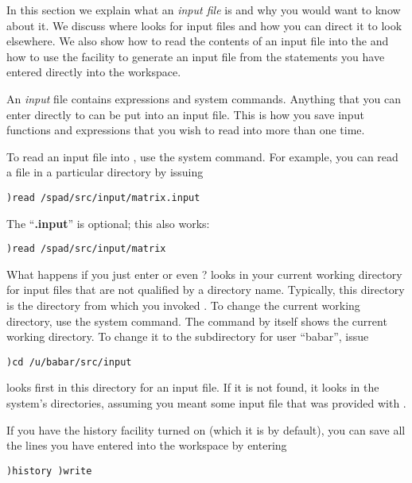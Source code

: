 %
In this section we explain what an {\it input file} is and
why you would want to know about it.
We discuss where \Language{} looks for input files and how you can
direct it to look elsewhere.
We also show how to read the contents of an input file into the
 and how to use the 
facility to generate an input file from the statements you have
entered directly into the workspace.

An {\it input} file contains \Language{} expressions and system
commands.
Anything that you can enter directly to \Language{} can be put
into an input file.
This is how you save input functions and expressions that you wish
to read into \Language{} more than one time.

To read an input file into \Language{}, use the 
system command.
For example, you can read a file in a particular directory by issuing
\begin{verbatim}
)read /spad/src/input/matrix.input
\end{verbatim}
The ``{\bf .input}'' is optional; this also works:
\begin{verbatim}
)read /spad/src/input/matrix
\end{verbatim}
What happens if you just enter
 or even ?
\Language{} looks in your current working directory for input files
that are not qualified by a directory name.
Typically, this directory is the directory from which you invoked
\Language{}.
To change the current working directory, use the  system command.
The command  by itself shows the current
working
directory.
To change it to
the  subdirectory for user ``babar'',
issue
\begin{verbatim}
)cd /u/babar/src/input
\end{verbatim}
\Language{} looks first in this directory for an input file.
If it is not found, it looks in the system's directories, assuming
you meant some input file that was provided with \Language{}.

\beginImportant
If you have the \Language{} history facility turned on (which it is
by default), you can save all the lines you have entered into the
workspace by entering
\begin{verbatim}
)history )write
\end{verbatim}

